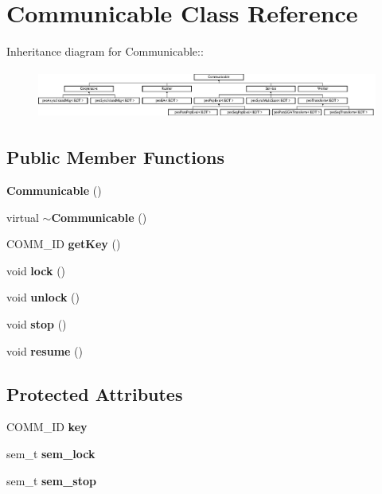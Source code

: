 \section{Communicable Class Reference}
\label{class_communicable}
Inheritance diagram for Communicable::\begin{figure}[H]
\begin{center}
\leavevmode
\includegraphics[height=1.6cm]{class_communicable}
\end{center}
\end{figure}
\subsection*{Public Member Functions}
\begin{CompactItemize}
\item 
{\bf Communicable} ()\label{class_communicable_8ae1827ecf7569b3db1ed386c7d8ad78}

\item 
virtual {\bf $\sim$Communicable} ()\label{class_communicable_2280b0dfa0d3a515fccf62c2a9fd5f41}

\item 
COMM\_\-ID {\bf get\-Key} ()\label{class_communicable_db4307b69b9ccacff55fdbf84b8f50e4}

\item 
void {\bf lock} ()\label{class_communicable_e1f8bd1ee810fd73d44315c95998d19d}

\item 
void {\bf unlock} ()\label{class_communicable_caa814847192e71f434fbf9479ede862}

\item 
void {\bf stop} ()\label{class_communicable_cb53e6534b947bc889aa181d9dbbd13b}

\item 
void {\bf resume} ()\label{class_communicable_3306a9adb11a0ab5af342c0db9f7bb2a}

\end{CompactItemize}
\subsection*{Protected Attributes}
\begin{CompactItemize}
\item 
COMM\_\-ID {\bf key}\label{class_communicable_605b0efeffe81326f216c9903f5bbf4c}

\item 
sem\_\-t {\bf sem\_\-lock}\label{class_communicable_cf9639312f71a2f348bc1e7789ccbd9d}

\item 
sem\_\-t {\bf sem\_\-stop}\label{class_communicable_29c53b9191348e0505e3bcba6d8b82b1}

\end{CompactItemize}
